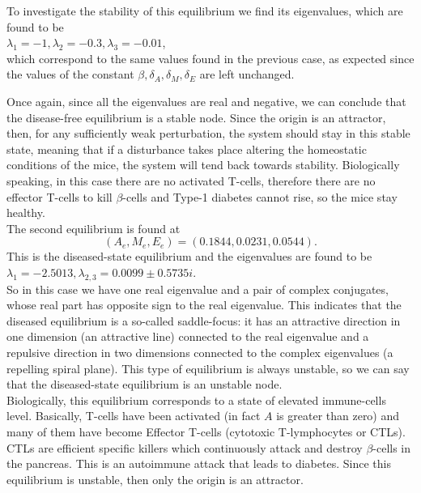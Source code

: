 To investigate the stability of this equilibrium we find its eigenvalues, which are found to be\\
$\lambda_{1}=-1, \lambda_{2}=-0.3, \lambda_{3}=-0.01$,\\
which correspond to the same values found in the previous case, as expected since the values of the constant $\beta, \delta_{A}, \delta_{M}, \delta_{E}$ are left unchanged.

Once again, since all the eigenvalues are real and negative, we can conclude that the disease-free equilibrium is a stable node. Since the origin is an attractor, then, for any sufficiently weak perturbation, the system should stay in this stable state, meaning that if a disturbance takes place altering the homeostatic conditions of the mice, the system will tend back towards stability. Biologically speaking, in this case there are no activated T-cells, therefore there are no effector T-cells to kill $\beta$-cells and Type-1 diabetes cannot rise, so the mice stay healthy.\\

The second equilibrium is found at 
$$
(A_{e},M_{e},E_{e})= (0.1844,0.0231,0.0544).
$$
This is the diseased-state equilibrium and the eigenvalues are found to be\\
$\lambda_{1}=-2.5013, \lambda_{2,3}=0.0099 \pm 0.5735i$.\\
So in this case we have one real eigenvalue and a pair of complex conjugates, whose real part has opposite sign to the real eigenvalue. This indicates that the diseased equilibrium is a so-called saddle-focus: it has an attractive direction in one dimension (an attractive line) connected to the real eigenvalue and a repulsive direction in two dimensions connected to the complex eigenvalues (a repelling spiral plane). This type of equilibrium is always unstable, so we can say that the diseased-state equilibrium is an unstable node.\\
Biologically, this equilibrium corresponds to a state of elevated immune-cells level. Basically, T-cells have been activated (in fact $A$ is greater than zero) and many of them have become Effector T-cells (cytotoxic T-lymphocytes or CTLs). CTLs are efficient specific killers which continuously attack and destroy $\beta$-cells in the pancreas. This is an autoimmune attack that leads to diabetes. Since this equilibrium is unstable, then only the origin is an attractor.\\

